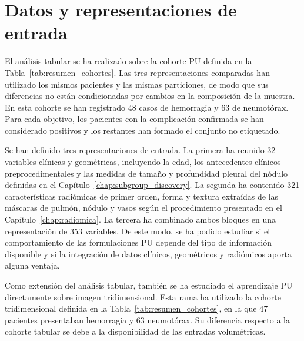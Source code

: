 \section{Datos y representaciones de entrada}

El análisis tabular se ha realizado sobre la cohorte PU definida en la Tabla~\ref{tab:resumen_cohortes}. Las tres representaciones comparadas han utilizado los mismos pacientes y las mismas particiones, de modo que sus diferencias no están condicionadas por cambios en la composición de la muestra. En esta cohorte se han registrado 48 casos de hemorragia y 63 de neumotórax. Para cada objetivo, los pacientes con la complicación confirmada se han considerado positivos y los restantes han formado el conjunto no etiquetado.

Se han definido tres representaciones de entrada. La primera ha reunido 32 variables clínicas y geométricas, incluyendo la edad, los antecedentes clínicos preprocedimentales y las medidas de tamaño y profundidad pleural del nódulo definidas en el Capítulo~\ref{chap:subgroup_discovery}. La segunda ha contenido 321 características radiómicas de primer orden, forma y textura extraídas de las máscaras de pulmón, nódulo y vasos según el procedimiento presentado en el Capítulo~\ref{chap:radiomica}. La tercera ha combinado ambos bloques en una representación de 353 variables. De este modo, se ha podido estudiar si el comportamiento de las formulaciones PU depende del tipo de información disponible y si la integración de datos clínicos, geométricos y radiómicos aporta alguna ventaja.

Como extensión del análisis tabular, también se ha estudiado el aprendizaje PU directamente sobre imagen tridimensional. Esta rama ha utilizado la cohorte tridimensional definida en la Tabla~\ref{tab:resumen_cohortes}, en la que 47 pacientes presentaban hemorragia y 63 neumotórax. Su diferencia respecto a la cohorte tabular se debe a la disponibilidad de las entradas volumétricas.



